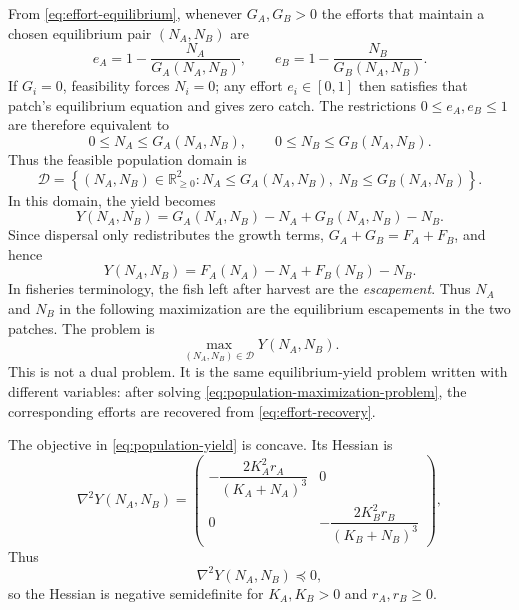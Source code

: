 \documentclass{article}
\numberwithin{equation}{section}
\begin{document}
From \eqref{eq:effort-equilibrium}, whenever $G_A,G_B>0$ the efforts
that maintain a chosen equilibrium pair $(N_A,N_B)$ are
\begin{equation}
    \label{eq:effort-recovery}
    e_A=1-\frac{N_A}{G_A(N_A,N_B)},
    \qquad
    e_B=1-\frac{N_B}{G_B(N_A,N_B)}.
\end{equation}
If $G_i=0$, feasibility forces $N_i=0$; any effort $e_i\in[0,1]$
then satisfies that patch's equilibrium equation and gives zero catch.
The restrictions $0\leq e_A,e_B\leq1$ are therefore equivalent to
\begin{equation}
    \label{eq:population-domain-inequalities}
    0\leq N_A\leq G_A(N_A,N_B),
    \qquad
    0\leq N_B\leq G_B(N_A,N_B).
\end{equation}
Thus the feasible population domain is
\begin{equation}
    \label{eq:population-domain}
    \mathcal D
    =
    \left\{
    (N_A,N_B)\in\mathbb R_{\geq0}^2:
    N_A\leq G_A(N_A,N_B),\;
    N_B\leq G_B(N_A,N_B)
    \right\}.
\end{equation}
In this domain, the yield becomes
\begin{equation}
    \label{eq:population-yield-before-separation}
    Y(N_A,N_B)
    =
    G_A(N_A,N_B)-N_A
    +
    G_B(N_A,N_B)-N_B.
\end{equation}
Since dispersal only redistributes the growth terms,
$G_A+G_B=F_A+F_B$, and hence
\begin{equation}
    \label{eq:population-yield}
    Y(N_A,N_B)
    =
    F_A(N_A)-N_A
    +
    F_B(N_B)-N_B.
\end{equation}
In fisheries terminology, the fish left after harvest are the
\emph{escapement}. Thus $N_A$ and $N_B$ in the following maximization
are the equilibrium escapements in the two patches. The problem is
\begin{equation}
    \label{eq:population-maximization-problem}
    \max_{(N_A,N_B)\in\mathcal D} Y(N_A,N_B).
\end{equation}
This is not a dual problem. It is the same equilibrium-yield problem written
with different variables: after solving \eqref{eq:population-maximization-problem},
the corresponding efforts are recovered from
\eqref{eq:effort-recovery}.

The objective in \eqref{eq:population-yield} is concave. Its Hessian is
\begin{equation}
    \label{eq:yield-hessian}
    \nabla^2Y(N_A,N_B)
    =
    \begin{pmatrix}
        -\dfrac{2K_A^2r_A}{(K_A+N_A)^3} & 0\\
        0 & -\dfrac{2K_B^2r_B}{(K_B+N_B)^3}
    \end{pmatrix},
\end{equation}
Thus
\begin{equation}
    \label{eq:yield-hessian-negative-semidefinite}
    \nabla^2Y(N_A,N_B)\preceq0,
\end{equation}
so the Hessian is negative semidefinite for $K_A,K_B>0$ and
$r_A,r_B\geq0$.
\end{document}
